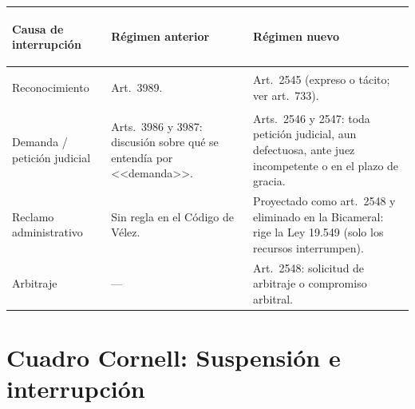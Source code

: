 \documentclass[12pt,oneside]{book}
\begin{document}
\begin{table}[H]
\centering\small
\begin{tabularx}{\textwidth}{>{\bfseries\raggedright\arraybackslash}p{3cm}>{\raggedright\arraybackslash}X>{\raggedright\arraybackslash}X}
\toprule
Causa de interrupci\'on & R\'egimen anterior & R\'egimen nuevo \\
\midrule
Reconocimiento & Art.\ 3989. & Art.\ 2545 (expreso o t\'acito; ver art.\ 733). \\
Demanda / petici\'on judicial & Arts.\ 3986 y 3987: discusi\'on sobre qu\'e se entend\'ia por <<demanda>>. & Arts.\ 2546 y 2547: toda petici\'on judicial, aun defectuosa, ante juez incompetente o en el plazo de gracia. \\
Reclamo administrativo & Sin regla en el C\'odigo de V\'elez. & Proyectado como art.\ 2548 y eliminado en la Bicameral: rige la Ley 19.549 (solo los recursos interrumpen). \\
Arbitraje & --- & Art.\ 2548: solicitud de arbitraje o compromiso arbitral. \\
\bottomrule
\end{tabularx}
\end{table}

\section*{Cuadro Cornell: Suspensi\'on e interrupci\'on}
\end{document}
